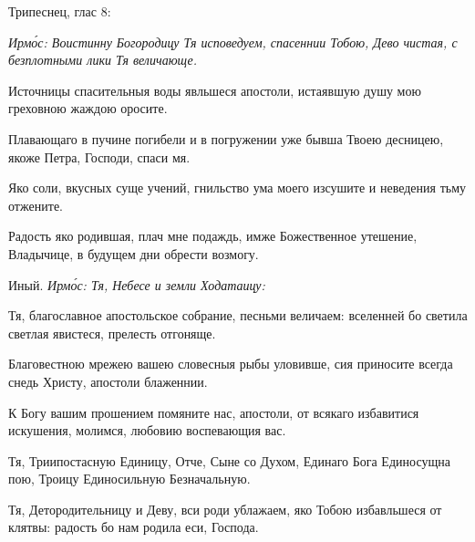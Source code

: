 Трипеснец, глас 8:\normalfont{}


\itshape Ирм\'{о}с\normalfont{}: Воистинну Богородицу Тя исповедуем, спасеннии Тобою, Дево чистая, с безплотными лики Тя величающе.


Источницы спасительныя воды явльшеся апостоли, истаявшую душу мою греховною жаждою оросите.


Плавающаго в пучине погибели и в погружении уже бывша Твоею десницею, якоже Петра, Господи, спаси мя.


Яко соли, вкусных суще учений, гнильство ума моего изсушите и неведения тьму отжените.


Радость яко родившая, плач мне подаждь, имже Божественное утешение, Владычице, в будущем дни обрести возмогу.

Иный. \itshape Ирм\'{о}с\normalfont{}: Тя, Небесе и земли Ходатаицу:


Тя, благославное апостольское собрание, песньми величаем: вселенней бо светила светлая явистеся, прелесть отгоняще.


Благовестною мрежею вашею словесныя рыбы уловивше, сия приносите всегда снедь Христу, апостоли блаженнии.


К Богу вашим прошением помяните нас, апостоли, от всякаго избавитися искушения, молимся, любовию воспевающия вас.


Тя, Триипостасную Единицу, Отче, Сыне со Духом, Единаго Бога Единосущна пою, Троицу Единосильную Безначальную.


Тя, Детородительницу и Деву, вси роди ублажаем, яко Тобою избавльшеся от клятвы: радость бо нам родила еси, Господа.

